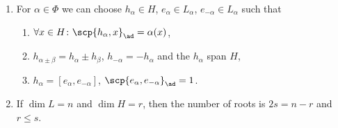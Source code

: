 \begin{enumerate}[label=(\roman*)]
	\item For $\alpha \in \Phi$ we can choose $h_\alpha \in H$,
		$e_\alpha \in L_\alpha$, $e_{-\alpha} \in L_{\alpha}$
		such that
		\begin{enumerate}[label=(\alph*)]
			\item $\forall x \in H\colon \scp{h_\alpha, x}_{\ad} = \alpha(x)$,
			\item $h_{\alpha \pm\beta} = h_{\alpha} \pm h_{\beta}$,
				$h_{-\alpha} = -h_{\alpha}$ and the $h_{\alpha}$ span $H$,
			\item $h_{\alpha} = [e_\alpha, e_{-\alpha}]$, $\scp{e_\alpha, e_{-\alpha}}_{\ad} = 1$.
	\end{enumerate}
\item If $\dim L = n$ and $\dim H = r$, then the number of roots is $2s = n-r$ and
	$r\leq s$.
\end{enumerate}
